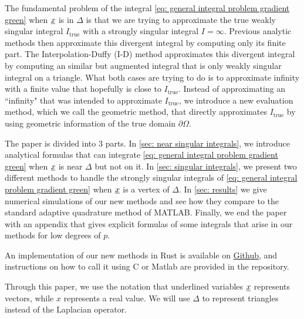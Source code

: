 \documentclass[../paper.tex]{subfiles}
\begin{document}
The fundamental problem of the integral \autoref{eq: general integral problem gradient green} when $\underline{x}$ is in $\Delta$ is that we are trying to approximate the true weakly singular integral $I_{\text{true}}$ with a strongly singular integral $I = \infty$. Previous analytic methods \cite{jarvenpaa2003singularity} then approximate this divergent integral by computing only its finite part. The Interpolation-Duffy (I-D) method approximates this divergent integral by computing an similar but augmented integral that is only weakly singular integral on a triangle. What both cases are trying to do is to approximate infinity with a finite value that hopefully is close to $I_{\text{true}}$. 
Instead of approximating an ``infinity" that was intended to approximate $I_{\text{true}}$, we introduce a new evaluation method, which we call the geometric method, that directly approximates $I_{\text{true}}$ by using geometric information of the true domain $\partial\Omega$. 

The paper is divided into 3 parts. In \autoref{sec: near singular integrals}, we introduce analytical formulas that can integrate \autoref{eq: general integral problem gradient green} when $\underline{x}$ is near $\Delta$ but not on it. In \autoref{sec: singular integrals}, we present two different methods to handle the strongly singular integrals of \autoref{eq: general integral problem gradient green} when $\underline{x}$ is a vertex of $\Delta$. In \autoref{sec: results} we give numerical simulations of our new methods and see how they compare to the standard adaptive quadrature method of MATLAB. Finally, we end the paper with an appendix that gives explicit formulas of some integrals that arise in our methods for low degrees of $p$.

An implementation of our new methods in Rust is available on \href{https://github.com/AfZheng126/AnalyticIntegrals}{Github}, and instructions on how to call it using C or Matlab are provided in the repository. 

Through this paper, we use the notation that underlined variables $\underline{x}$ represents vectors, while $x$ represents a real value. 
We will use $\Delta$ to represent triangles instead of the Laplacian operator.
\end{document}
